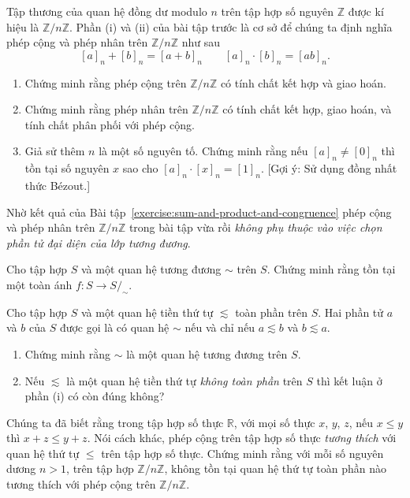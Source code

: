 \begin{exercise}
    Tập thương của quan hệ đồng dư modulo $n$ trên tập hợp số nguyên $\mathbb{Z}$ được kí hiệu là $\mathbb{Z}/n\mathbb{Z}$. Phần (i) và (ii) của bài tập trước là cơ sở để chúng ta định nghĩa phép cộng và phép nhân trên $\mathbb{Z}/n\mathbb{Z}$ như sau
    \[
        {[a]}_{n} + {[b]}_{n} = {[a+b]}_{n}\qquad {[a]}_{n}\cdot {[b]}_{n} = {[ab]}_{n}.    
    \]
    \begin{enumerate}[label={(\roman*)}]
        \item Chứng minh rằng phép cộng trên $\mathbb{Z}/n\mathbb{Z}$ có tính chất kết hợp và giao hoán.
        \item Chứng minh rằng phép nhân trên $\mathbb{Z}/n\mathbb{Z}$ có tính chất kết hợp, giao hoán, và tính chất phân phối với phép cộng.
        \item Giả sử thêm $n$ là một số nguyên tố. Chứng minh rằng nếu ${[a]}_{n}\ne {[0]}_{n}$ thì tồn tại số nguyên $x$ sao cho ${[a]}_{n}\cdot {[x]}_{n} = {[1]}_{n}$. [Gợi ý: Sử dụng đồng nhất thức B\'{e}zout.]
    \end{enumerate}
\end{exercise}

Nhờ kết quả của Bài tập~\ref{exercise:sum-and-product-and-congruence} phép cộng và phép nhân trên $\mathbb{Z}/n\mathbb{Z}$ trong bài tập vừa rồi \textit{không phụ thuộc vào việc chọn phần tử đại diện của lớp tương đương}.

\begin{exercise}
    Cho tập hợp $S$ và một quan hệ tương đương $\sim$ trên $S$. Chứng minh rằng tồn tại một toàn ánh $f: S\to S/_{\sim}$.
\end{exercise}

\begin{exercise}
    Cho tập hợp $S$ và một quan hệ tiền thứ tự $\lesssim$ toàn phần trên $S$. Hai phần tử $a$ và $b$ của $S$ được gọi là có quan hệ $\sim$ nếu và chỉ nếu $a\lesssim b$ và $b\lesssim a$.
    \begin{enumerate}[label={(\roman*)}]
        \item Chứng minh rằng $\sim$ là một quan hệ tương đương trên $S$.
        \item Nếu $\lesssim$ là một quan hệ tiền thứ tự \textit{không toàn phần} trên $S$ thì kết luận ở phần (i) có còn đúng không?
    \end{enumerate}
\end{exercise}

\begin{exercise}
    Chúng ta đã biết rằng trong tập hợp số thực $\mathbb{R}$, với mọi số thực $x$, $y$, $z$, nếu $x\leq y$ thì $x + z\leq y + z$. Nói cách khác, phép cộng trên tập hợp số thực \textit{tương thích} với quan hệ thứ tự $\leq$ trên tập hợp số thực. Chứng minh rằng với mỗi số nguyên dương $n > 1$, trên tập hợp $\mathbb{Z}/n\mathbb{Z}$, không tồn tại quan hệ thứ tự toàn phần nào tương thích với phép cộng trên $\mathbb{Z}/n\mathbb{Z}$.
\end{exercise}

